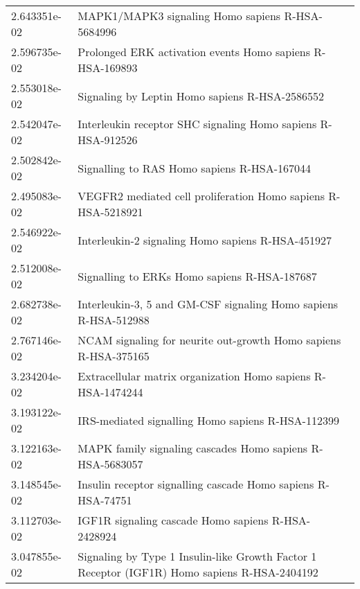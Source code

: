 \begin{longtable}{p{2.4cm}p{14.5cm}}
             2.643351e-02 &                                              MAPK1/MAPK3 signaling Homo sapiens R-HSA-5684996 \\
             2.596735e-02 &                                     Prolonged ERK activation events Homo sapiens R-HSA-169893 \\
             2.553018e-02 &                                                Signaling by Leptin Homo sapiens R-HSA-2586552 \\
             2.542047e-02 &                                  Interleukin receptor SHC signaling Homo sapiens R-HSA-912526 \\
             2.502842e-02 &                                                   Signalling to RAS Homo sapiens R-HSA-167044 \\
             2.495083e-02 &                                 VEGFR2 mediated cell proliferation Homo sapiens R-HSA-5218921 \\
             2.546922e-02 &                                             Interleukin-2 signaling Homo sapiens R-HSA-451927 \\
             2.512008e-02 &                                                  Signalling to ERKs Homo sapiens R-HSA-187687 \\
             2.682738e-02 &                               Interleukin-3, 5 and GM-CSF signaling Homo sapiens R-HSA-512988 \\
             2.767146e-02 &                               NCAM signaling for neurite out-growth Homo sapiens R-HSA-375165 \\
             3.234204e-02 &                                  Extracellular matrix organization Homo sapiens R-HSA-1474244 \\
             3.193122e-02 &                                             IRS-mediated signalling Homo sapiens R-HSA-112399 \\
             3.122163e-02 &                                     MAPK family signaling cascades Homo sapiens R-HSA-5683057 \\
             3.148545e-02 &                                  Insulin receptor signalling cascade Homo sapiens R-HSA-74751 \\
             3.112703e-02 &                                            IGF1R signaling cascade Homo sapiens R-HSA-2428924 \\
             3.047855e-02 &  Signaling by Type 1 Insulin-like Growth Factor 1 Receptor (IGF1R) Homo sapiens R-HSA-2404192 \\

\end{longtable}
